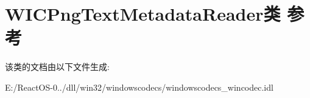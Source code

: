 \hypertarget{class_w_i_c_png_text_metadata_reader}{}\section{W\+I\+C\+Png\+Text\+Metadata\+Reader类 参考}
\label{class_w_i_c_png_text_metadata_reader}


该类的文档由以下文件生成\+:\begin{DoxyCompactItemize}
\item 
E\+:/\+React\+O\+S-\/0../dll/win32/windowscodecs/windowscodecs\+\_\+wincodec.\+idl\end{DoxyCompactItemize}
